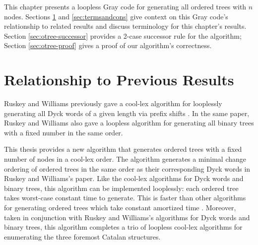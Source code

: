 This chapter presents a loopless Gray code for generating all ordered trees with $n$ nodes. 
Sections \ref{sec:otree-otherresults} and \ref{sec:termsandcons} give context on this Gray code's relationship to related results and discuss terminology for this chapter's results. Section \ref{sec:otree-successor} provides a 2-case successor rule for the algorithm; Section \ref{sec:otree-proof} gives a proof of our algorithm's correctness.


\section{Relationship to Previous Results} \label{sec:otree-otherresults}
Ruskey and Williams previously gave a cool-lex algorithm for looplessly generating all Dyck words  of a given length via prefix shifts \cite{ruskey2008generating}.  In the same paper, Ruskey and Williams also gave a loopless algorithm for generating all binary trees with a fixed number in the same order.

This thesis provides a new algorithm that generates ordered trees with a fixed number of nodes in a cool-lex order. The algorithm generates a minimal change ordering of ordered trees in the same order as their corresponding Dyck words in Ruskey and Williams's paper. Like the cool-lex algorithms for Dyck words and binary trees, this algorithm can be implemented looplessly: each ordered tree takes worst-case constant time to generate. This is faster than other algorithms for generating ordered trees which take constant amortized time \cite{parque2021efficient} \cite{er1985lexotrees} \cite{zaks1980lexotrees} \cite{skarbek1988pointerotrees}. Moreover, taken in conjunction with Ruskey and Williams's algorithms for Dyck words and binary trees, this algorithm completes a trio of loopless cool-lex algorithms for enumerating the three foremost Catalan structures.


